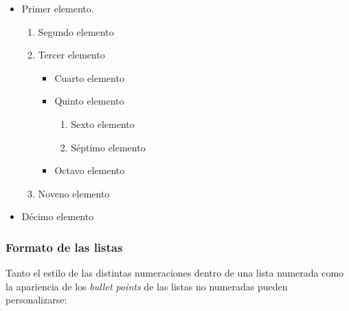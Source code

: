 \documentclass[a4paper, 11pt, spanish, twoside]{article}
\begin{document}
\begin{itemize}
    \item Primer elemento.
    \begin{enumerate}
        \item Segundo elemento
        \item Tercer elemento
        \begin{itemize}
            \item Cuarto elemento
            \item Quinto elemento
            \begin{enumerate}
                \item Sexto elemento
                \item Séptimo elemento
            \end{enumerate}
            \item Octavo elemento
        \end{itemize}
        \item Noveno elemento
    \end{enumerate}
    \item Décimo elemento
\end{itemize}


\subsubsection{Formato de las listas}

Tanto el estilo de las distintas numeraciones dentro de una lista numerada como la apariencia de los \textit{bullet points} de las listas no numeradas pueden personalizarse:

\renewcommand{\labelenumi}{\Roman{enumi}} %
\renewcommand{\labelenumii}{\Alph{enumii}} %
\renewcommand{\labelitemi}{\textbullet} %
\renewcommand{\labelitemii}{\textasteriskcentered} %
\end{document}
